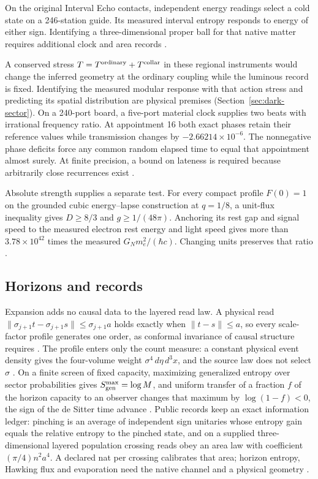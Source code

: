 \documentclass[11pt]{article}
\theoremstyle{definition}
\theoremstyle{remark}
\begin{document}
On the original Interval Echo contacts,
independent energy readings select a cold state on a 246-station guide.
Its measured interval entropy responds to energy of either sign.
Identifying a three-dimensional proper ball for that native matter
requires additional clock and area records \cite{ophEinstein}.


A conserved stress $T=T^{\rm ordinary}+T^{\rm collar}$ in these
regional instruments would change the inferred geometry at the ordinary
coupling while the luminous record is fixed. Identifying the measured
modular response with that action stress and predicting its spatial
distribution are physical premises (Section~\ref{sec:dark-sector}).
On a 240-port board, a five-port material clock supplies two beats with
irrational frequency ratio. At appointment 16 both exact phases retain
their reference values while transmission changes by
$-2.66214\times10^{-6}$. The nonnegative phase deficits force any common
random elapsed time to equal that appointment almost surely. At finite
precision, a bound on lateness is required because arbitrarily close
recurrences exist \cite{ophEinstein}.

Absolute strength supplies a separate test. For every compact profile
$F(0)=1$ on the grounded cubic energy--lapse construction at $q=1/8$,
a unit-flux inequality gives $D\ge8/3$ and $g\ge1/(48\pi)$.
Anchoring its rest gap and signal speed to the measured electron rest
energy and light speed gives more than $3.78\times10^{42}$ times the
measured $G_Nm_e^2/(\hbar c)$. Changing units preserves that ratio
\cite{ophEinstein}.

\subsection{Horizons and records}
\label{sec:expansion-records}

Expansion adds no causal data to the layered read law. A physical read
$\|\sigma_{j+1}t-\sigma_{j+1}s\|\leq\sigma_{j+1}a$ holds exactly when $\|t-s\|\leq a$, so every
scale-factor profile generates one order, as conformal invariance of causal structure requires
\cite{hawkingkingmccarthy1976,malament1977}. The profile enters only the count measure: a constant
physical event density gives the four-volume weight $\sigma^4\,d\eta\,d^3x$, and the source law does
not select $\sigma$ \cite{ophinflation}. On a finite screen of fixed capacity, maximizing generalized
entropy over sector probabilities gives $S_{\rm gen}^{\max}=\log M$, and uniform transfer of a fraction
$f$ of the horizon capacity to an observer changes that maximum by $\log(1-f)<0$, the sign of the
de Sitter time advance \cite{ophdesitter}. Public records keep an exact information ledger: pinching
is an average of independent sign unitaries whose entropy gain equals the relative entropy to the
pinched state, and on a supplied three-dimensional layered population crossing reads obey an area
law with coefficient $(\pi/4)n^2a^4$. A declared nat per crossing calibrates that area; horizon
entropy, Hawking flux and evaporation need the native channel and a physical geometry
\cite{ophblackhole}.
\end{document}
